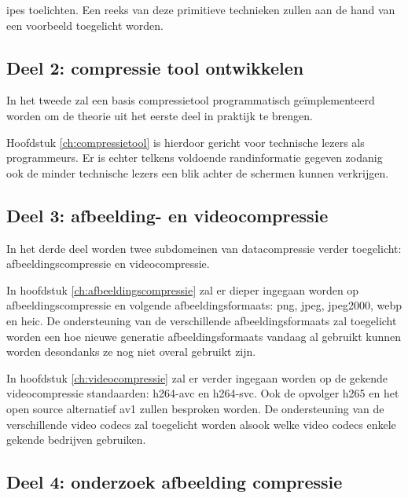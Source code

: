 ipes toelichten. Een reeks van deze primitieve technieken zullen aan de hand van een voorbeeld toegelicht worden.

\subsection{Deel 2: compressie tool ontwikkelen}
\label{sec:opzet-bachelorproef-deel-2}
 
 In het tweede zal een basis \gls{compressietool} programmatisch geïmplementeerd worden om de theorie uit het eerste deel in praktijk te brengen.
 
Hoofdstuk \ref{ch:compressietool} is hierdoor gericht voor technische lezers als programmeurs. Er is echter telkens voldoende randinformatie gegeven zodanig ook de minder technische lezers een blik achter de schermen kunnen verkrijgen.

\subsection{Deel 3: afbeelding- en videocompressie}
\label{sec:opzet-bachelorproef-deel-3}

In het derde deel worden twee subdomeinen van \gls{datacompressie} verder toegelicht: \gls{afbeeldingscompressie} en \gls{videocompressie}. 

In hoofdstuk \ref{ch:afbeeldingscompressie} zal er dieper ingegaan worden op \gls{afbeeldingscompressie} en volgende \glspl{afbeeldingsformaat}: \gls{png}, \gls{jpeg}, \gls{jpeg2000}, \gls{webp} en \gls{heic}. De ondersteuning van de verschillende \glspl{afbeeldingsformaat} zal toegelicht worden een hoe nieuwe generatie \glspl{afbeeldingsformaat} vandaag al gebruikt kunnen worden desondanks ze nog niet overal gebruikt zijn.

In hoofdstuk \ref{ch:videocompressie} zal er verder ingegaan worden op de gekende \gls{videocompressie} standaarden: \gls{h264-avc} en \gls{h264-svc}. Ook de opvolger \gls{h265} en het open source alternatief \gls{av1} zullen besproken worden. De ondersteuning van de verschillende video \glspl{codec} zal toegelicht worden alsook welke video \glspl{codec} enkele gekende bedrijven gebruiken.

\subsection{Deel 4: onderzoek afbeelding compressie}
\label{sec:opzet-bachelorproef-deel-4}

